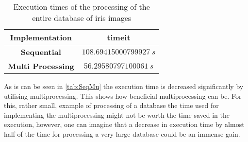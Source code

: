 \begin{table}[H]
\centering
\caption{Execution times of the processing of the entire database of iris images }
\label{tab:SeqMu}
\begin{tabular}{ |c|c| }
\hline
\textbf{Implementation}&\textbf{timeit} \\
\hline
\textbf{Sequential}&$108.69415000799927~s$\\
\hline
\textbf{Multi Processing}&$56.29580797100061~s$\\
\hline
\end{tabular}
\end{table}
\noindent
As is can be seen in \autoref{tab:SeqMu} the execution time is decreased significantly by utilising multiprocessing. This shows how beneficial multiprocessing can be. For this, rather small, example of processing of a database  the time used for implementing the multiprocessing might not be worth the time saved in the execution, however, one can imagine that a decrease in execution time by almost half of the time for processing a very large database could be an immense gain. 

     